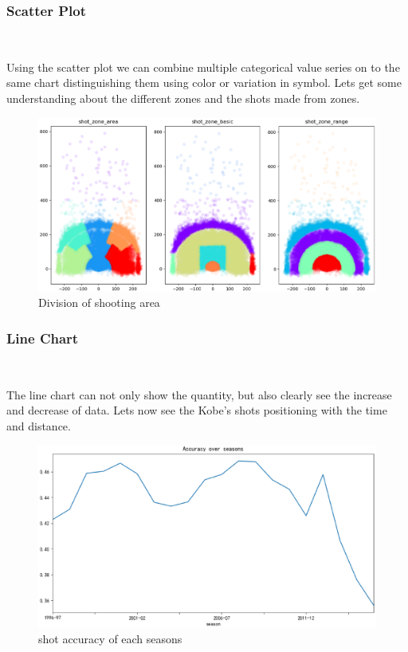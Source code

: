 \subsubsection{Scatter Plot}
\

Using the scatter plot we can combine multiple 
categorical value series on to the same chart distinguishing them using color or 
variation in symbol.
Lets get some understanding about the different zones and the shots made from zones.
\begin{figure}[H]
		\centering
	\includegraphics[scale=0.3]{h.eps
	}        %
	\caption{Division of shooting area}
	\label{fig4}

\end{figure}

\subsubsection{Line Chart}
\

The line chart can not only show the quantity, but also clearly see the increase and decrease of data.
Lets now see the Kobe's shots positioning with the time and distance.

\begin{figure}[H]
	\centering
	\includegraphics[scale=0.28]{m.eps
	}        %
	\caption{shot accuracy of each seasons}
	\label{fig5}
\end{figure}

